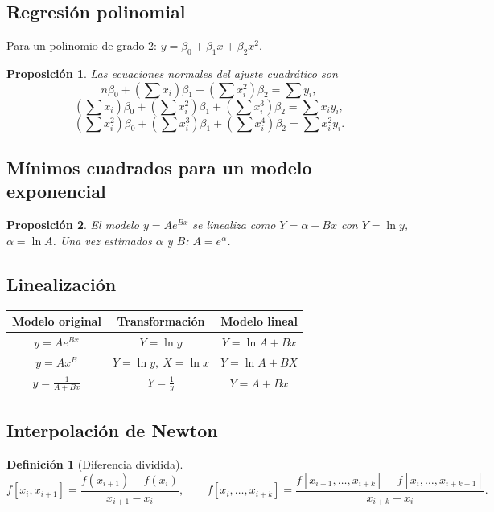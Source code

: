 \documentclass[a4paper,12pt]{article}
\theoremstyle{definition}
\newtheorem{definicion}{Definición}[section]
\theoremstyle{plain}
\newtheorem{proposicion}{Proposición}[section]
\begin{document}
\subsection{Regresión polinomial}

Para un polinomio de grado 2: $y=\beta_0+\beta_1 x+\beta_2 x^2$.

\begin{proposicion}
Las ecuaciones normales del ajuste cuadrático son
\[
n\beta_0+\left(\sum x_i\right)\beta_1+\left(\sum x_i^2\right)\beta_2
= \sum y_i,
\]
\[
\left(\sum x_i\right)\beta_0+\left(\sum x_i^2\right)\beta_1
+\left(\sum x_i^3\right)\beta_2 = \sum x_i y_i,
\]
\[
\left(\sum x_i^2\right)\beta_0+\left(\sum x_i^3\right)\beta_1
+\left(\sum x_i^4\right)\beta_2 = \sum x_i^2 y_i.
\]
\end{proposicion}

\subsection{Mínimos cuadrados para un modelo exponencial}

\begin{proposicion}
El modelo $y=Ae^{Bx}$ se linealiza como $Y = \alpha + Bx$ con
$Y=\ln y$, $\alpha=\ln A$. Una vez estimados $\alpha$ y $B$: $A=e^\alpha$.
\end{proposicion}

\subsection{Linealización}

\begin{center}
\begin{tabular}{ccc}
\toprule
Modelo original & Transformación & Modelo lineal \\
\midrule
$y=Ae^{Bx}$ & $Y=\ln y$ & $Y=\ln A + Bx$ \\
$y=Ax^B$ & $Y=\ln y,\ X=\ln x$ & $Y=\ln A + BX$ \\
$y=\frac{1}{A+Bx}$ & $Y=\frac{1}{y}$ & $Y=A+Bx$ \\
\bottomrule
\end{tabular}
\end{center}

\subsection{Interpolación de Newton}

\begin{definicion}[Diferencia dividida]
\[
f[x_i,x_{i+1}] = \frac{f(x_{i+1})-f(x_i)}{x_{i+1}-x_i},
\qquad
f[x_i,\dots,x_{i+k}]
= \frac{f[x_{i+1},\dots,x_{i+k}]-f[x_i,\dots,x_{i+k-1}]}{x_{i+k}-x_i}.
\]
\end{definicion}
\end{document}
